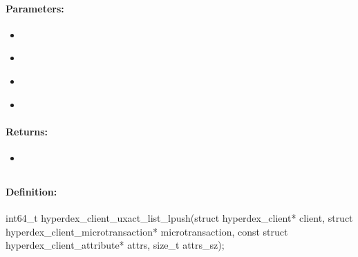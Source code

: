 \paragraph{Parameters:}
\begin{itemize}[noitemsep]
\item {}\\

\item {}\\

\item {}\\

\item {}\\

\end{itemize}

\paragraph{Returns:}
\begin{itemize}[noitemsep]
\item {}\\

\end{itemize}

\pagebreak
\subsection{}
\label{api:c:uxact_list_lpush}


\paragraph{Definition:}
\begin{ccode}
int64_t hyperdex_client_uxact_list_lpush(struct hyperdex_client* client,
        struct hyperdex_client_microtransaction* microtransaction,
        const struct hyperdex_client_attribute* attrs, size_t attrs_sz);
\end{ccode}

